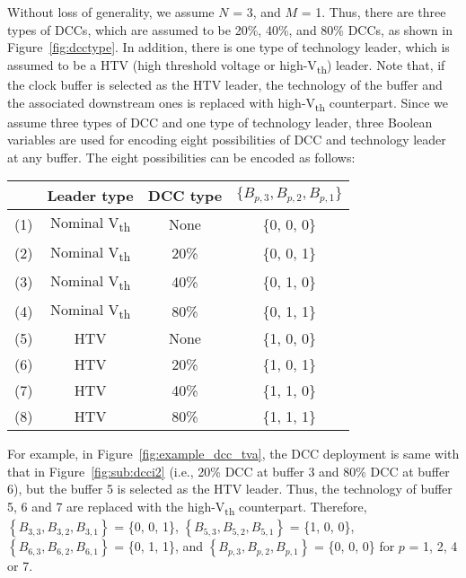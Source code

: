 Without loss of generality, we assume $N$ = 3, and $M$ = 1. Thus, there are three types of DCCs, which are assumed to be 20\%, 40\%, and 80\% DCCs, as shown in Figure~\ref{fig:dcctype}. In addition, there is one type of technology leader, which is assumed to be a HTV (high threshold voltage or high-V\textsubscript{th}) leader. Note that, if the clock buffer is selected as the HTV leader, the technology of the buffer and the associated downstream ones is replaced with high-V\textsubscript{th} counterpart. Since we assume three types of DCC and one type of technology leader, three Boolean variables are used for encoding eight possibilities of DCC and technology leader at any buffer. The eight possibilities can be encoded as follows:\newline

\begin{tabular}{ | c | c | c | c | }
	\hline
  	 & Leader type & DCC type & $\{B_{p,3}, B_{p,2}, B_{p,1}\}$ \\ \hline
  	(1)\quad & Nominal V\textsubscript{th} & None & \{0, 0, 0\} \\ \hline
  	(2)\quad & Nominal V\textsubscript{th} &20\% &  \{0, 0, 1\} \\ \hline
  	(3)\quad & Nominal V\textsubscript{th} &40\% &  \{0, 1, 0\} \\ \hline
  	(4)\quad & Nominal V\textsubscript{th} &80\% &  \{0, 1, 1\} \\ \hline
	(5)\quad & HTV & None & \{1, 0, 0\} \\ \hline
  	(6)\quad & HTV & 20\% &  \{1, 0, 1\} \\ \hline
  	(7)\quad & HTV & 40\% &  \{1, 1, 0\} \\ \hline
  	(8)\quad & HTV & 80\% &  \{1, 1, 1\} \\ \hline 
\end{tabular}


For example, in Figure~\ref{fig:example_dcc_tva}, the DCC deployment is same with that in Figure~\ref{fig:sub:dcci2} (i.e., 20\% DCC at buffer 3 and 80\% DCC at buffer 6), but the buffer 5 is selected as the HTV leader. Thus, the technology of buffer 5, 6 and 7 are replaced with the high-V\textsubscript{th} counterpart. Therefore, $\left\{B_{3,3}, B_{3,2}, B_{3,1}\right\}$ = \{0, 0, 1\}, $\left\{B_{5,3}, B_{5,2}, B_{5,1}\right\}$ = \{1, 0, 0\}, $\left\{B_{6,3}, B_{6,2}, B_{6,1}\right\}$ = \{0, 1, 1\}, and $\left\{B_{p,3}, B_{p,2}, B_{p,1}\right\}$ = \{0, 0, 0\} for $p$ = 1, 2, 4 or 7.

